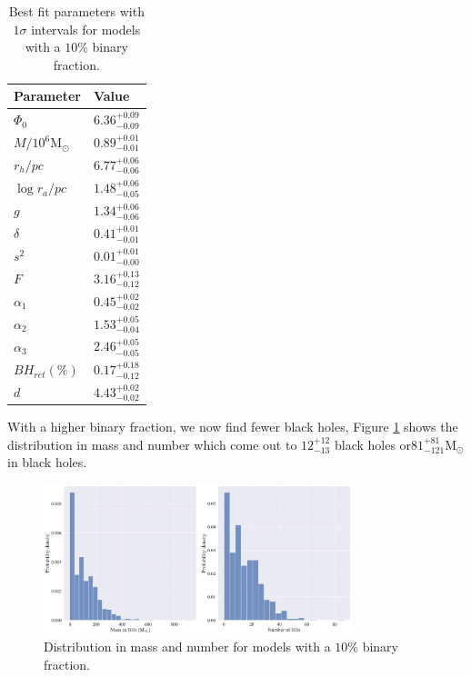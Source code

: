 \begin{table}
	\centering
	\caption{Best fit parameters with $1\sigma$ intervals for models with a $10\%$ binary fraction.}
	\begin{tabular}{l l}

		\hline
		Parameter                 & Value                  \\
		\hline
		$\Phi_0$                  & $6.36^{+0.09}_{-0.09}$ \\
		$M/10^6 \mathrm{M}_\odot$ & $0.89^{+0.01}_{-0.01}$ \\
		$r_h / pc$                & $6.77^{+0.06}_{-0.06}$ \\
		$\log{r_a / pc}$          & $1.48^{+0.06}_{-0.05}$ \\
		$g$                       & $1.34^{+0.06}_{-0.06}$ \\
		$\delta$                  & $0.41^{+0.01}_{-0.01}$ \\
		$s^2$                     & $0.01^{+0.01}_{-0.00}$ \\
		$F$                       & $3.16^{+0.13}_{-0.12}$ \\
		$\alpha_1$                & $0.45^{+0.02}_{-0.02}$ \\
		$\alpha_2$                & $1.53^{+0.05}_{-0.04}$ \\
		$\alpha_3$                & $2.46^{+0.05}_{-0.05}$ \\
		$BH_{ret} (\%)$           & $0.17^{+0.18}_{-0.12}$ \\
		$d$                       & $4.43^{+0.02}_{-0.02}$ \\
		\hline
	\end{tabular}
	\label{tab:parameters_highbin}
\end{table}

With a higher binary fraction, we now find fewer black holes, Figure
\ref{fig:high_bin_model_BH_dists} shows the distribution in mass and number which come out to
$12^{+12}_{-13}$ black holes or$81 ^{+81}_{-121} \mathrm{M}_\odot$ in black holes.


\begin{figure}
	\centering
	\includegraphics[width=0.8\textwidth]{figures/high_bin_model/BH_dists.png}
	\caption{Distribution in mass and number for models with a $10\%$ binary fraction.}
	\label{fig:high_bin_model_BH_dists}
\end{figure}



